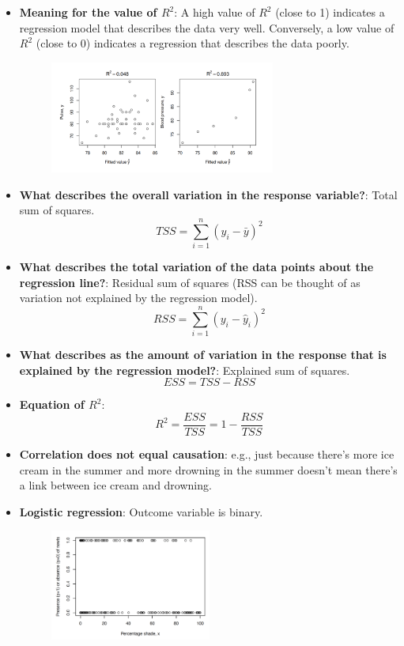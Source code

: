 \documentclass[12pt]{book}
\begin{document}
\begin{itemize}
\item \textbf{Meaning for the value of $R^2$}: A high value of $R^2$ (close to 1) indicates a regression model that describes the data very well. Conversely, a low value of $R^2$ (close to 0) indicates a regression that describes the data poorly.
\begin{figure}[H]
    \centering
    \includegraphics[width=0.7\textwidth]{9.png}
\end{figure}
\item \textbf{What describes the overall variation in the response variable?}: Total sum of squares.
$$TSS = \sum_{i=1}^{n} (y_i - \bar{y})^2$$
\item \textbf{What describes the total variation of the data points about the regression line?}: Residual sum of squares (RSS can be thought of as variation not explained by the regression model).
$$RSS = \sum_{i=1}^{n} (y_i - \hat{y}_i)^2$$
\item \textbf{What describes as the amount of variation in the response that is explained by the regression model?}: Explained sum of squares.
$$ESS = TSS - RSS$$
\item \textbf{Equation of $R^2$}: 
$$R^2 = \frac{ESS}{TSS} = 1 - \frac{RSS}{TSS}$$
\item \textbf{Correlation does not equal causation}: e.g., just because there's more ice cream in the summer and more drowning in the summer doesn't mean there's a link between ice cream and drowning.
\item \textbf{Logistic regression}: Outcome variable is binary.
\begin{figure}[H]
    \centering
    \includegraphics[width=0.5\textwidth]{91.png}

\end{figure}
\end{itemize}
\end{document}
